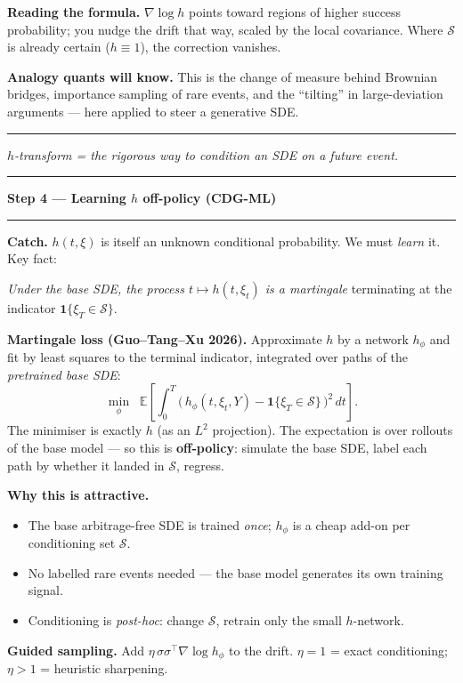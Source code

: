\documentclass[12pt]{article}
\newcommand{\slide}[1]{%
  \par\noindent\rule{\linewidth}{1.2pt}\par\vspace{2pt}%
  {\LARGE\bfseries #1}\par\vspace{2pt}%
  \noindent\rule{\linewidth}{0.5pt}\par\vspace{8pt}}
\newcommand{\footer}[1]{\vfill\noindent\rule{\linewidth}{0.3pt}\par
  {\small\itshape #1}}
\newcommand{\E}{\mathbb{E}}
\newcommand{\ind}{\mathbf{1}}
\newcommand{\cS}{\mathcal{S}}
\begin{document}
\vspace{6pt}
\textbf{Reading the formula.} $\nabla\log h$ points toward regions of higher
success probability; you nudge the drift that way, scaled by the local
covariance. Where $\cS$ is already certain ($h\equiv1$), the correction
vanishes.

\vspace{6pt}
\textbf{Analogy quants will know.} This is the change of measure behind
Brownian bridges, importance sampling of rare events, and the ``tilting'' in
large-deviation arguments --- here applied to steer a generative SDE.

\footer{$h$-transform = the rigorous way to condition an SDE on a future event.}
\clearpage

\slide{Step 4 --- Learning $h$ off-policy (CDG-ML)}

\textbf{Catch.} $h(t,\xi)$ is itself an unknown conditional probability.
We must \emph{learn} it. Key fact:

\vspace{4pt}
\emph{Under the base SDE, the process $t\mapsto h(t,\xi_t)$ is a
martingale} terminating at the indicator $\ind\{\xi_T\in\cS\}$.

\vspace{6pt}
\textbf{Martingale loss (Guo--Tang--Xu 2026).} Approximate $h$ by a network
$h_\phi$ and fit by least squares to the terminal indicator, integrated over
paths of the \emph{pretrained base SDE}:
\[
\min_\phi \;\;\E\!\left[\int_0^T
\bigl(\,h_\phi(t,\xi_t,Y) - \ind\{\xi_T\in\cS\}\,\bigr)^2\,dt\right].
\]
The minimiser is exactly $h$ (as an $L^2$ projection). The expectation is
over rollouts of the base model --- so this is \textbf{off-policy}: simulate
the base SDE, label each path by whether it landed in $\cS$, regress.

\vspace{6pt}
\textbf{Why this is attractive.}
\begin{itemize}
\item The base arbitrage-free SDE is trained \emph{once}; $h_\phi$ is a
  cheap add-on per conditioning set $\cS$.
\item No labelled rare events needed --- the base model generates its own
  training signal.
\item Conditioning is \emph{post-hoc}: change $\cS$, retrain only the small
  $h$-network.
\end{itemize}

\vspace{4pt}
\textbf{Guided sampling.} Add $\eta\,\sigma\sigma^\top\nabla\log h_\phi$ to
the drift. $\eta=1$ = exact conditioning; $\eta>1$ = heuristic sharpening.
\end{document}
